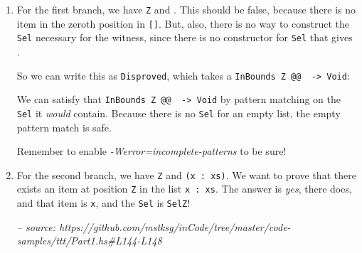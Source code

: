 \documentclass[]{article}
\newenvironment{Shaded}{}{}
\newcommand{\CommentTok}[1]{\textcolor[rgb]{0.38,0.63,0.69}{\textit{#1}}}
\newcommand{\DataTypeTok}[1]{\textcolor[rgb]{0.56,0.13,0.00}{#1}}
\newcommand{\FunctionTok}[1]{\textcolor[rgb]{0.02,0.16,0.49}{#1}}
\newcommand{\KeywordTok}[1]{\textcolor[rgb]{0.00,0.44,0.13}{\textbf{#1}}}
\newcommand{\NormalTok}[1]{#1}
\newcommand{\OtherTok}[1]{\textcolor[rgb]{0.00,0.44,0.13}{#1}}
\begin{document}
\begin{enumerate}
\def\labelenumi{\arabic{enumi}.}
\item
  For the first branch, we have \texttt{\textquotesingle{}Z} and
  \texttt{\textquotesingle{}{[}{]}}. This should be false, because there is no
  item in the zeroth position in \texttt{{[}{]}}. But, also, there is no way to
  construct the \texttt{Sel} necessary for the witness, since there is no
  constructor for \texttt{Sel} that gives \texttt{\textquotesingle{}{[}{]}}.

  So we can write this as \texttt{Disproved}, which takes a
  \texttt{InBounds\ \textquotesingle{}Z\ @@\ \textquotesingle{}{[}{]}\ -\textgreater{}\ Void}:

\begin{Shaded}
\end{Shaded}

  We can satisfy that
  \texttt{InBounds\ \textquotesingle{}Z\ @@\ \textquotesingle{}{[}{]}\ -\textgreater{}\ Void}
  by pattern matching on the \texttt{Sel} it \emph{would} contain. Because there
  is no \texttt{Sel} for an empty list, the empty pattern match is safe.

  Remember to enable \emph{-Werror=incomplete-patterns} to be sure!
\item
  For the second branch, we have \texttt{\textquotesingle{}Z} and
  \texttt{(x\ \textquotesingle{}:\ xs)}. We want to prove that there exists an
  item at position \texttt{\textquotesingle{}Z} in the list
  \texttt{x\ \textquotesingle{}:\ xs}. The answer is \emph{yes}, there does, and
  that item is \texttt{x}, and the \texttt{Sel} is \texttt{SelZ}!

\begin{Shaded}
\begin{Highlighting}[]
\CommentTok{-- source: https://github.com/mstksg/inCode/tree/master/code-samples/ttt/Part1.hs#L144-L148}


\end{Highlighting}
\end{Shaded}
\end{enumerate}
\end{document}
